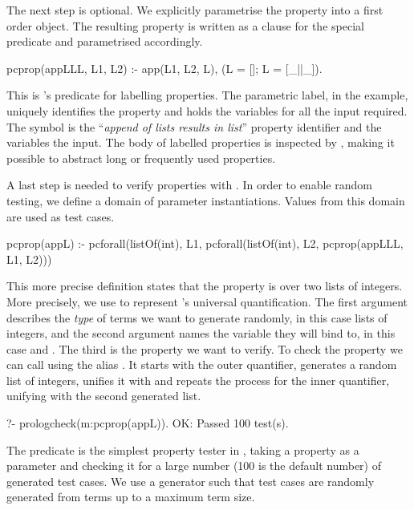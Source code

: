 The next step is optional.
%
We explicitly parametrise the property into a first order object.
%
The resulting property
is  written as a clause for the special
predicate  and parametrised accordingly.
%
\begin{yapcode}
 pcprop({appLLL, L1, L2}) :- app(L1, L2, L), (L = []; L = [_||_]).
\end{yapcode}
%
This is \plqc{}'s predicate for labelling properties.
%
The parametric label,  in the example, uniquely
identifies the property and holds the variables for all the input
required. %
%
The symbol  is the ``\emph{append of lists results in list}''
property identifier and the variables  the input.
%
The body of labelled properties is inspected by \plqc{},
making it possible to abstract long or
frequently used properties.


A last step is needed to verify properties with \plqc{}.
%
In order to enable random testing, we define a domain of parameter
instantiations.
%
Values from this domain are used as test cases.
%
\begin{yapcode}
 pcprop(appL) :- pcforall(listOf(int), L1, pcforall(listOf(int), L2,
                   pcprop({appLLL, L1, L2})))
\end{yapcode}


This more precise definition states that the property  is 
over two lists of integers.
%
More precisely, we use  to represent \plqc{}'s universal quantification.
%
The first argument describes the \emph{type} of terms we want to
generate randomly, in this case lists of integers,
and the second argument names the variable they will bind to, in this case
 and .
%
The third is the property we want to verify.
%
To check the property we can call \plqc{} using the alias
.
%
It starts with the outer  quantifier, generates a random
list of integers, unifies it with  and repeats the process for
the inner quantifier, unifying  with the second generated list.
%
\begin{yapcode}
   ?- prologcheck(m:pcprop(appL)).
 OK: Passed 100 test(s).
\end{yapcode}
%
The  predicate is the simplest property tester in
\plqc{}, taking a property as a parameter and checking it for a large
number (100 is the default number) of generated test cases.
%
We use a generator such that test cases are randomly generated from
terms up to a maximum term size.


